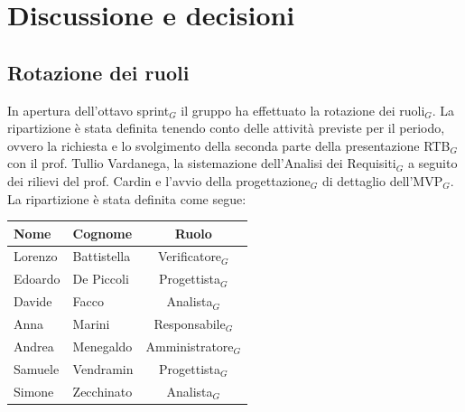 \documentclass[a4paper, 10pt, colorlinks=true, linkcolor=black, urlcolor=blue, citecolor=blue, hidelinks]{article}
\begin{document}
\section{Discussione e decisioni}

\subsection{Rotazione dei ruoli}
In apertura dell'ottavo sprint$_G$ il gruppo ha effettuato la rotazione dei ruoli$_G$. La ripartizione è stata definita tenendo conto delle attività previste per il periodo, ovvero la richiesta e lo svolgimento della seconda parte della presentazione RTB$_G$ con il prof. Tullio Vardanega, la sistemazione dell'Analisi dei Requisiti$_G$ a seguito dei rilievi del prof. Cardin e l'avvio della progettazione$_G$ di dettaglio dell'MVP$_G$. La ripartizione è stata definita come segue:
\begin{center}
    \begin{tabular}{|l|l|c|}
        \hline
        \textbf{Nome} & \textbf{Cognome} & \textbf{Ruolo} \\
        \hline
        Lorenzo & Battistella & Verificatore$_G$ \\
        \hline
        Edoardo & De Piccoli & Progettista$_G$ \\
        \hline
        Davide & Facco & Analista$_G$ \\
        \hline
        Anna & Marini & Responsabile$_G$ \\
        \hline
        Andrea & Menegaldo & Amministratore$_G$ \\
        \hline
        Samuele & Vendramin & Progettista$_G$ \\
        \hline
        Simone & Zecchinato & Analista$_G$ \\
        \hline
    \end{tabular}
\end{center}
\end{document}

